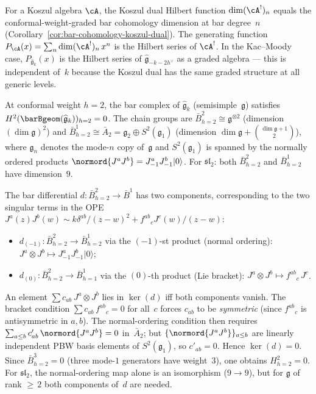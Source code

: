 \begin{remark}\label{rem:bar-hilbert-koszul-dual}
For a Koszul algebra $\cA$, the Koszul dual Hilbert function $\dim (\cA^!)_n$ equals the conformal-weight-graded bar cohomology dimension at bar degree~$n$ (Corollary~\ref{cor:bar-cohomology-koszul-dual}).  The generating function $P_{\cA}(x) = \sum_n \dim (\cA^!)_n\, x^n$ is the Hilbert series of $\cA^!$.  In the Kac--Moody case, $P_{\widehat{\mathfrak{g}}_k}(x)$ is the Hilbert series of $\widehat{\mathfrak{g}}_{-k-2h^\vee}$ as a graded algebra --- this is independent of~$k$ because the Koszul dual has the same graded structure at all generic levels.
\end{remark}

\begin{lemma}\label{lem:bar-deg2-symmetric-square}
At conformal weight $h = 2$, the bar complex of
$\widehat{\mathfrak{g}}_k$ (semisimple~$\mathfrak{g}$) satisfies
$H^2(\barBgeom(\widehat{\mathfrak{g}}_k))_{h=2} = 0$.
The chain groups are $\bar{B}^2_{h=2} \cong \mathfrak{g}^{\otimes 2}$
(dimension~$(\dim\mathfrak{g})^2$) and
$\bar{B}^1_{h=2} \cong \bar{A}_2 = \mathfrak{g}_2 \oplus S^2(\mathfrak{g}_1)$
(dimension $\dim\mathfrak{g} + \binom{\dim\mathfrak{g}+1}{2}$),
where $\mathfrak{g}_n$ denotes the mode-$n$ copy of~$\mathfrak{g}$
and $S^2(\mathfrak{g}_1)$ is spanned by the normally ordered products
$\normord{J^a J^b} = J^a_{-1}J^b_{-1}|0\rangle$.  For
$\mathfrak{sl}_2$: both $\bar{B}^2_{h=2}$ and $\bar{B}^1_{h=2}$
have dimension~$9$.

The bar differential $d \colon \bar{B}^2_{h=2} \to \bar{B}^1$
has two components, corresponding to the two singular terms in the
OPE $J^a(z)J^b(w) \sim k\delta^{ab}/(z-w)^2 + f^{ab}{}_c
J^c(w)/(z-w)$:
\begin{itemize}
\item $d_{(-1)} \colon \bar{B}^2_{h=2} \to \bar{B}^1_{h=2}$
  via the $(-1)$-st product (normal ordering):
  $J^a \otimes J^b \mapsto J^a_{-1}J^b_{-1}|0\rangle$;

\item $d_{(0)} \colon \bar{B}^2_{h=2} \to \bar{B}^1_{h=1}$
  via the $(0)$-th product (Lie bracket):
  $J^a \otimes J^b \mapsto f^{ab}{}_c\, J^c$.
\end{itemize}

An element $\sum c_{ab}\, J^a \otimes J^b$ lies in $\ker(d)$ iff
both components vanish.  The bracket condition
$\sum c_{ab}\, f^{ab}{}_c = 0$ for all~$c$ forces $c_{ab}$
to be \emph{symmetric} (since $f^{ab}{}_c$ is antisymmetric in
$a,b$).  The normal-ordering condition then requires
$\sum_{a \leq b} c'_{ab}\, \normord{J^a J^b} = 0$
in~$\bar{A}_2$; but $\{\normord{J^a J^b}\}_{a \leq b}$ are
linearly independent PBW basis elements of
$S^2(\mathfrak{g}_1)$, so $c'_{ab} = 0$.
Hence $\ker(d) = 0$.  Since $\bar{B}^3_{h=2} = 0$ (three
mode-$1$ generators have weight~$3$), one obtains $H^2_{h=2} = 0$.
For $\mathfrak{sl}_2$, the normal-ordering map alone is an
isomorphism ($9 \to 9$), but for $\mathfrak{g}$ of rank
${\geq}\, 2$ both components of~$d$ are needed.


\end{lemma}
